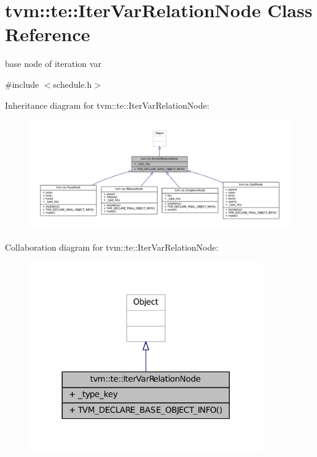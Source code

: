 \hypertarget{classtvm_1_1te_1_1IterVarRelationNode}{}\section{tvm\+:\+:te\+:\+:Iter\+Var\+Relation\+Node Class Reference}
\label{classtvm_1_1te_1_1IterVarRelationNode}


base node of iteration var  




{\ttfamily \#include $<$schedule.\+h$>$}



Inheritance diagram for tvm\+:\+:te\+:\+:Iter\+Var\+Relation\+Node\+:
\nopagebreak
\begin{figure}[H]
\begin{center}
\leavevmode
\includegraphics[width=350pt]{classtvm_1_1te_1_1IterVarRelationNode__inherit__graph}
\end{center}
\end{figure}


Collaboration diagram for tvm\+:\+:te\+:\+:Iter\+Var\+Relation\+Node\+:
\nopagebreak
\begin{figure}[H]
\begin{center}
\leavevmode
\includegraphics[width=284pt]{classtvm_1_1te_1_1IterVarRelationNode__coll__graph}
\end{center}
\end{figure}
